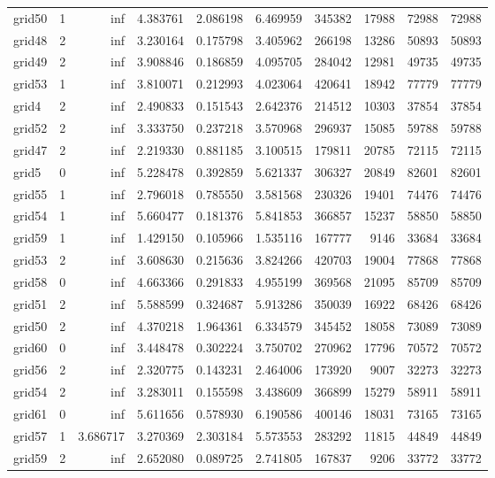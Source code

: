 \begin{longtable}{|l|r|r|r|r|r|r|r|r|r|}
grid50 & 1 & inf & 4.383761 & 2.086198 & 6.469959 & 345382 & 17988 & 72988 & 72988 \\
grid48 & 2 & inf & 3.230164 & 0.175798 & 3.405962 & 266198 & 13286 & 50893 & 50893 \\
grid49 & 2 & inf & 3.908846 & 0.186859 & 4.095705 & 284042 & 12981 & 49735 & 49735 \\
grid53 & 1 & inf & 3.810071 & 0.212993 & 4.023064 & 420641 & 18942 & 77779 & 77779 \\
grid4 & 2 & inf & 2.490833 & 0.151543 & 2.642376 & 214512 & 10303 & 37854 & 37854 \\
grid52 & 2 & inf & 3.333750 & 0.237218 & 3.570968 & 296937 & 15085 & 59788 & 59788 \\
grid47 & 2 & inf & 2.219330 & 0.881185 & 3.100515 & 179811 & 20785 & 72115 & 72115 \\
grid5 & 0 & inf & 5.228478 & 0.392859 & 5.621337 & 306327 & 20849 & 82601 & 82601 \\
grid55 & 1 & inf & 2.796018 & 0.785550 & 3.581568 & 230326 & 19401 & 74476 & 74476 \\
grid54 & 1 & inf & 5.660477 & 0.181376 & 5.841853 & 366857 & 15237 & 58850 & 58850 \\
grid59 & 1 & inf & 1.429150 & 0.105966 & 1.535116 & 167777 & 9146 & 33684 & 33684 \\
grid53 & 2 & inf & 3.608630 & 0.215636 & 3.824266 & 420703 & 19004 & 77868 & 77868 \\
grid58 & 0 & inf & 4.663366 & 0.291833 & 4.955199 & 369568 & 21095 & 85709 & 85709 \\
grid51 & 2 & inf & 5.588599 & 0.324687 & 5.913286 & 350039 & 16922 & 68426 & 68426 \\
grid50 & 2 & inf & 4.370218 & 1.964361 & 6.334579 & 345452 & 18058 & 73089 & 73089 \\
grid60 & 0 & inf & 3.448478 & 0.302224 & 3.750702 & 270962 & 17796 & 70572 & 70572 \\
grid56 & 2 & inf & 2.320775 & 0.143231 & 2.464006 & 173920 & 9007 & 32273 & 32273 \\
grid54 & 2 & inf & 3.283011 & 0.155598 & 3.438609 & 366899 & 15279 & 58911 & 58911 \\
grid61 & 0 & inf & 5.611656 & 0.578930 & 6.190586 & 400146 & 18031 & 73165 & 73165 \\
grid57 & 1 & 3.686717 & 3.270369 & 2.303184 & 5.573553 & 283292 & 11815 & 44849 & 44849 \\
grid59 & 2 & inf & 2.652080 & 0.089725 & 2.741805 & 167837 & 9206 & 33772 & 33772 \\

\end{longtable}
